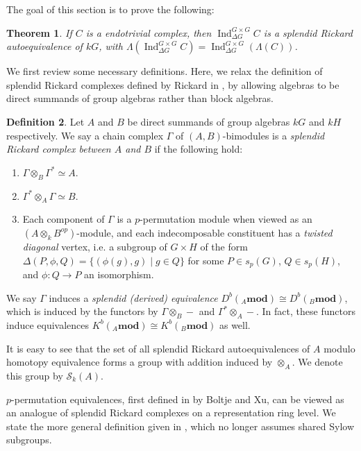 \documentclass[10pt,letterpaper, boxed, cm]{amsart}
\newcommand{\Ind}{\operatorname{Ind}}
\newcommand{\calS}{\mathcal{S}}
\newtheorem{theorem}{Theorem}[section]
\theoremstyle{remark}
\theoremstyle{definition}
\newtheorem{definition}[theorem]{Definition}
\begin{document}
	The goal of this section is to prove the following:

	\begin{theorem} \label{srcinductionthm}
		If $C$ is a endotrivial complex, then $\Ind^{G\times G}_{\Delta G}C$ is a splendid Rickard autoequivalence of $kG$, with $\Lambda(\Ind^{G\times G}_{\Delta G} C) = \Ind^{G\times G}_{\Delta G} (\Lambda(C))$.
	\end{theorem}

	We first review some necessary definitions. Here, we relax the definition of splendid Rickard complexes defined by Rickard in \cite{R96}, by allowing algebras to be direct summands of group algebras rather than block algebras.

	\begin{definition}\label{SRCdef}
		Let $A$ and $B$ be direct summands of group algebras $kG$ and $kH$ respectively. We say a chain complex $\Gamma$ of $(A,B)$-bimodules is a \textit{splendid Rickard complex between $A$ and $B$} if the following hold:
		\begin{enumerate}
			\item $\Gamma \otimes_B \Gamma^* \simeq A$.
			\item $\Gamma^* \otimes_A \Gamma \simeq B$.
			\item Each component of $\Gamma$ is a $p$-permutation module when viewed as an $(A\otimes_k B^{op})$-module, and each indecomposable constituent has a \textit{twisted diagonal} vertex, i.e. a subgroup of $G\times H$ of the form $\Delta(P, \phi, Q) = \{(\phi(g),g) \mid g \in Q\}$ for some $P \in s_p(G)$, $Q \in s_p(H)$, and $\phi: Q \to P$ an isomorphism.
		\end{enumerate}
		We say $\Gamma$ induces a \textit{splendid (derived) equivalence} $D^b({}_A\mathbf{mod}) \cong D^b({}_B\mathbf{mod})$, which is induced by the functors by $\Gamma\otimes_B -$ and $\Gamma^*\otimes_A -$. In fact, these functors induce equivalences $K^b({}_A\mathbf{mod}) \cong K^b({}_B\mathbf{mod})$ as well.

		It is easy to see that the set of all splendid Rickard autoequivalences of $A$ modulo homotopy equivalence forms a group with addition induced by $\otimes_A$. We denote this group by $\calS_k(A)$.
	\end{definition}

	$p$-permutation equivalences, first defined in \cite{BX07} by Boltje and Xu, can be viewed as an analogue of splendid Rickard complexes on a representation ring level. We state the more general definition given in \cite{BP20}, which no longer assumes shared Sylow subgroups.
\end{document}
